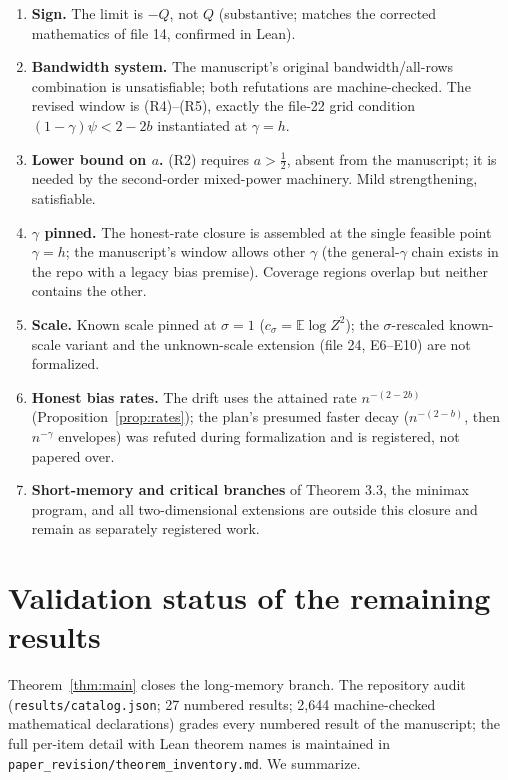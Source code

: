 \documentclass[11pt]{article}
\theoremstyle{definition}
\theoremstyle{remark}
\begin{document}
\begin{enumerate}
\item \textbf{Sign.} The limit is $-Q$, not $Q$ (substantive; matches the
      corrected mathematics of file 14, confirmed in Lean).
\item \textbf{Bandwidth system.} The manuscript's original bandwidth/all-rows
      combination is unsatisfiable; both refutations are machine-checked. The
      revised window is (R4)--(R5), exactly the file-22 grid condition
      $(1-\gamma)\psi < 2-2b$ instantiated at $\gamma=h$.
\item \textbf{Lower bound on $a$.} (R2) requires $a > \tfrac12$, absent from the
      manuscript; it is needed by the second-order mixed-power machinery. Mild
      strengthening, satisfiable.
\item \textbf{$\gamma$ pinned.} The honest-rate closure is assembled at the
      single feasible point $\gamma = h$; the manuscript's window allows other
      $\gamma$ (the general-$\gamma$ chain exists in the repo with a legacy
      bias premise). Coverage regions overlap but neither contains the other.
\item \textbf{Scale.} Known scale pinned at $\sigma = 1$
      ($c_\sigma=\mathbb{E}\log Z^2$); the $\sigma$-rescaled known-scale
      variant and the unknown-scale extension (file 24, E6--E10) are not
      formalized.
\item \textbf{Honest bias rates.} The drift uses the attained rate
      $n^{-(2-2b)}$ (Proposition~\ref{prop:rates}); the plan's presumed
      faster decay ($n^{-(2-b)}$, then $n^{-\gamma}$ envelopes) was refuted
      during formalization and is registered, not papered over.
\item \textbf{Short-memory and critical branches} of Theorem 3.3, the minimax
      program, and all two-dimensional extensions are outside this closure and
      remain as separately registered work.
\end{enumerate}


\section{Validation status of the remaining results}\label{sec:status}

Theorem~\ref{thm:main} closes the long-memory branch. The repository audit
(\texttt{results/catalog.json}; 27 numbered results; 2{,}644 machine-checked
mathematical declarations) grades every numbered result of the manuscript;
the full per-item detail with Lean theorem names is maintained in
\texttt{paper\_\allowbreak{}revision/\allowbreak{}theorem\_\allowbreak{}inventory.\allowbreak{}md}. We summarize.
\end{document}
